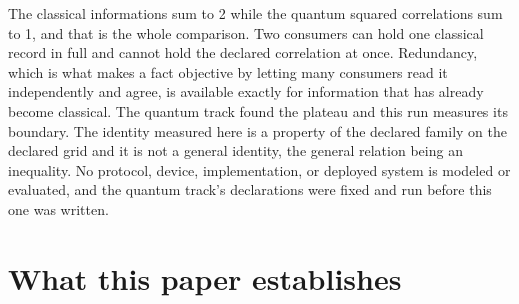 \documentclass[aps,pre,reprint,nofootinbib]{revtex4-2}
\begin{document}
The classical informations sum to 2 while the quantum squared
correlations sum to 1, and that is the whole comparison.  Two
consumers can hold one classical record in full and cannot hold the
declared correlation at once.  Redundancy, which is what makes a fact
objective by letting many consumers read it independently and agree,
is available exactly for information that has already become
classical.  The quantum track found the plateau and this run measures
its boundary.
The identity measured here is a property of the declared family on the
declared grid and it is not a general identity, the general relation
being an inequality.  No protocol, device, implementation, or deployed
system is modeled or evaluated, and the quantum track's declarations
were fixed and run before this one was written.

\section{What this paper establishes}
\label{sec:claims}
\end{document}
